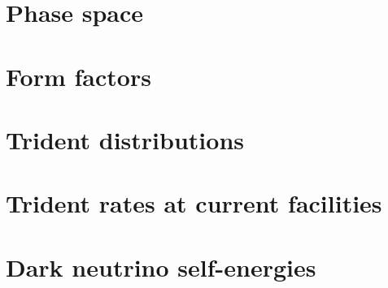 \documentclass[openany,twoside,frontopenright]{ip3thesis}
\begin{document}
\appendixpageoff
\begin{appendices}
\let\clearpage\relax
\chapter{Phase space}\label{app:phase_space}


\chapter{Form factors}\label{app:form_factors}


\chapter{Trident distributions}\label{app:trident_distributions}


\chapter{Trident rates at current facilities}\label{app:rates_other}


\chapter{Dark neutrino self-energies}\label{app:loop_masses}

\end{appendices}



\end{document}

